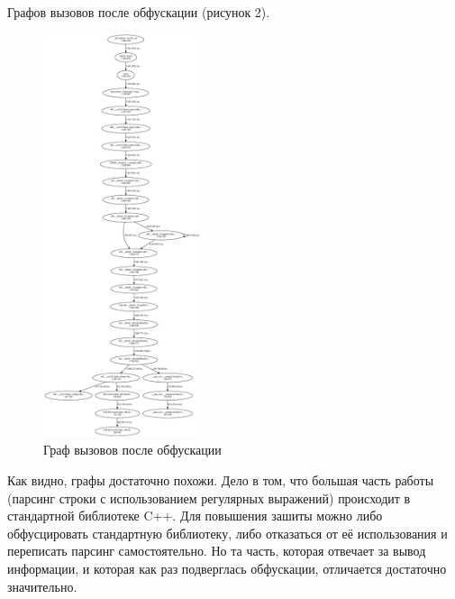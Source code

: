 \newpage

Графов вызовов после обфускации (рисунок 2).

\begin{figure}[htp]
\begin{center}
  \includegraphics[width=0.41\textwidth]{res/callgraph2}
  \caption{Граф вызовов после обфускации}
  \label{fig:myGraph2}
\end{center}
\end{figure}

Как видно, графы достаточно похожи. Дело в том, что большая часть работы (парсинг строки с использованием регулярных выражений) происходит в стандартной библиотеке C++. Для повышения зашиты можно либо обфусцировать стандартную библиотеку, либо отказаться от её использования и переписать парсинг самостоятельно. Но та часть, которая отвечает за вывод информации, и которая как раз подверглась обфускации, отличается достаточно значительно.